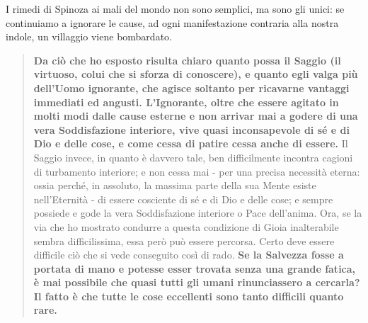 I rimedi di Spinoza ai mali del mondo non sono semplici, ma sono gli unici: se continuiamo a ignorare le cause, ad ogni manifestazione contraria alla nostra indole, un villaggio viene bombardato.

\begin{quotation}
	\small \textbf{Da ciò che ho esposto risulta chiaro quanto possa il Saggio (il virtuoso, colui che si sforza di conoscere), e quanto egli valga più dell’Uomo ignorante, che agisce soltanto per ricavarne vantaggi immediati ed angusti. L’Ignorante, oltre che essere agitato in molti modi dalle cause esterne e non arrivar mai a godere di una
	vera Soddisfazione interiore, vive quasi inconsapevole di sé e di Dio e delle cose, e come
	cessa di patire cessa anche di essere.} Il Saggio invece, in quanto è davvero tale, ben difficilmente incontra cagioni di turbamento interiore; e non cessa mai - per una precisa necessità eterna: ossia perché, in assoluto, la massima parte della sua Mente esiste nell’Eternità
	- di essere cosciente di sé e di Dio e delle cose; e sempre possiede e gode la vera Soddisfazione interiore o Pace dell’anima.
	Ora, se la via che ho mostrato condurre a questa condizione di Gioia inalterabile  sembra difficilissima, essa però può essere percorsa. Certo deve essere difficile ciò che si vede conseguito così di rado. \textbf{Se la Salvezza fosse a
	portata di mano e potesse esser trovata senza una grande fatica, è mai possibile che quasi
	tutti gli umani rinunciassero a cercarla? Il fatto è che tutte le cose eccellenti sono tanto difficili quanto rare.}
\end{quotation}

\newpage
